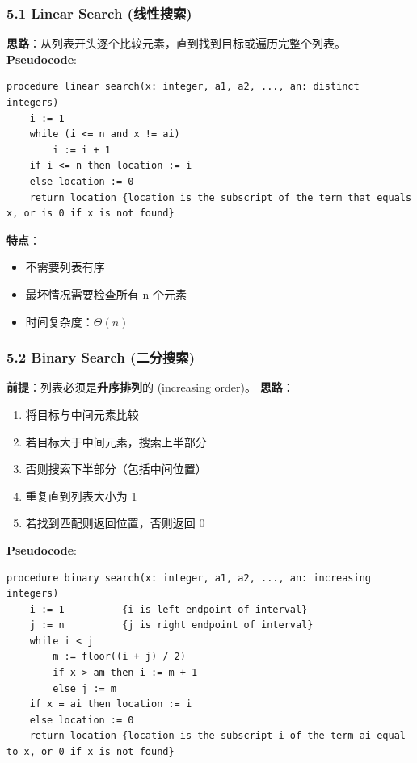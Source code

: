 \documentclass[10pt,a4paper,openany]{ctexbook}
\theoremstyle{definition}
\theoremstyle{remark}
\begin{document}
\subsubsection{5.1 Linear Search (线性搜索)}

\textbf{思路}：从列表开头逐个比较元素，直到找到目标或遍历完整个列表。
\textbf{Pseudocode}:
{\footnotesize\begin{verbatim}
procedure linear search(x: integer, a1, a2, ..., an: distinct integers)
    i := 1
    while (i <= n and x != ai)
        i := i + 1
    if i <= n then location := i
    else location := 0
    return location {location is the subscript of the term that equals x, or is 0 if x is not found}
\end{verbatim}}

\textbf{特点}：
\begin{itemize}
\item 不需要列表有序
\item 最坏情况需要检查所有 n 个元素
\item 时间复杂度：$\Theta(n)$

\end{itemize}

\subsubsection{5.2 Binary Search (二分搜索)}

\textbf{前提}：列表必须是\textbf{升序排列}的 (increasing order)。
\textbf{思路}：
\begin{enumerate}
\item 将目标与中间元素比较
\item 若目标大于中间元素，搜索上半部分
\item 否则搜索下半部分（包括中间位置）
\item 重复直到列表大小为 1
\item 若找到匹配则返回位置，否则返回 0

\end{enumerate}

\textbf{Pseudocode}:
{\footnotesize\begin{verbatim}
procedure binary search(x: integer, a1, a2, ..., an: increasing integers)
    i := 1          {i is left endpoint of interval}
    j := n          {j is right endpoint of interval}
    while i < j
        m := floor((i + j) / 2)
        if x > am then i := m + 1
        else j := m
    if x = ai then location := i
    else location := 0
    return location {location is the subscript i of the term ai equal to x, or 0 if x is not found}
\end{verbatim}}
\end{document}

